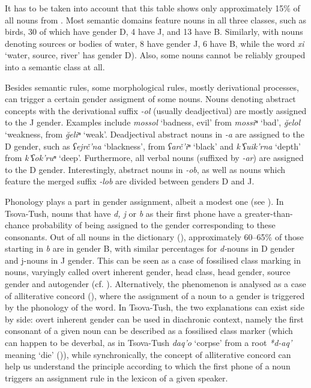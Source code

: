 It has to be taken into account that this table shows only approximately 15\% of all nouns from \textcite{kadkad84}. Most semantic domains feature nouns in all three classes, such as birds, 30 of which have gender D, 4 have J, and 13 have B. Similarly, with nouns denoting sources or bodies of water, 8  have gender J, 6 have B, while the word \textit{xi} ‘water, source, river’ has gender D). Also, some nouns cannot be reliably grouped into a semantic class at all.


Besides semantic rules, some morphological rules, mostly derivational processes, can trigger a certain gender assigment of some nouns. Nouns denoting abstract concepts with the derivational suffix \textit{-ol} (usually deadjectival) are mostly assigned to the J gender. Examples include \textit{mossol} `badness, evil’ from \textit{mossiⁿ} `bad’, \textit{\u{g}elol}  `weakness, from \textit{\u{g}eliⁿ} `weak’. Deadjectival abstract nouns in \textit{-a} are assigned to the D gender, such as \textit{ʕejrč'na}  `blackness’, from \textit{ʕarč'iⁿ} `black’ and \textit{k'ʕuik'rna} `depth’ from \textit{k'ʕok'ruⁿ} `deep’. Furthermore, all verbal nouns (suffixed by \textit{-ar}) are assigned to the D gender. Interestingly, abstract nouns in \textit{-ob}, as well as nouns which feature the merged suffix \textit{-lob} are divided between genders D and J. 

Phonology plays a part in gender assignment, albeit a modest one (see \cite{bellamyWS}). In Tsova-Tush, nouns that have \textit{d, j} or \textit{b} as their first phone have a greater-than-chance probability of being assigned to the gender corresponding to these consonants. Out of all nouns in the  dictionary (\cite{kadkad84}), approximately 60--65\% of those starting in \textit{b} are in gender B, with similar percentages for \textit{d-}nouns in D gender and j\textit{}-nouns in J gender. This can be seen as a case of fossilised class marking in nouns, varyingly called overt inherent gender, head class, head gender, source gender and autogender (cf. \cite[147]{nichols11}). Alternatively, the phenomenon is analysed as a case of alliterative concord (\cite[117]{corbett91}), where the assignment of a noun to a gender is triggered by the phonology of the word. In Tsova-Tush, the two explanations can exist side by side: overt inherent gender can be used in diachronic context, namely the first consonant of a given noun can be described as a fossilised class marker (which can happen to be deverbal, as in Tsova-Tush \textit{daq'o} `corpse’ from a root \textit{*d-aq'} meaning `die’ (\cite[258]{nichols03cc})), while synchronically, the concept of alliterative concord can help us understand the principle according to which the first phone of a noun triggers an assignment rule in the lexicon of a given speaker.

